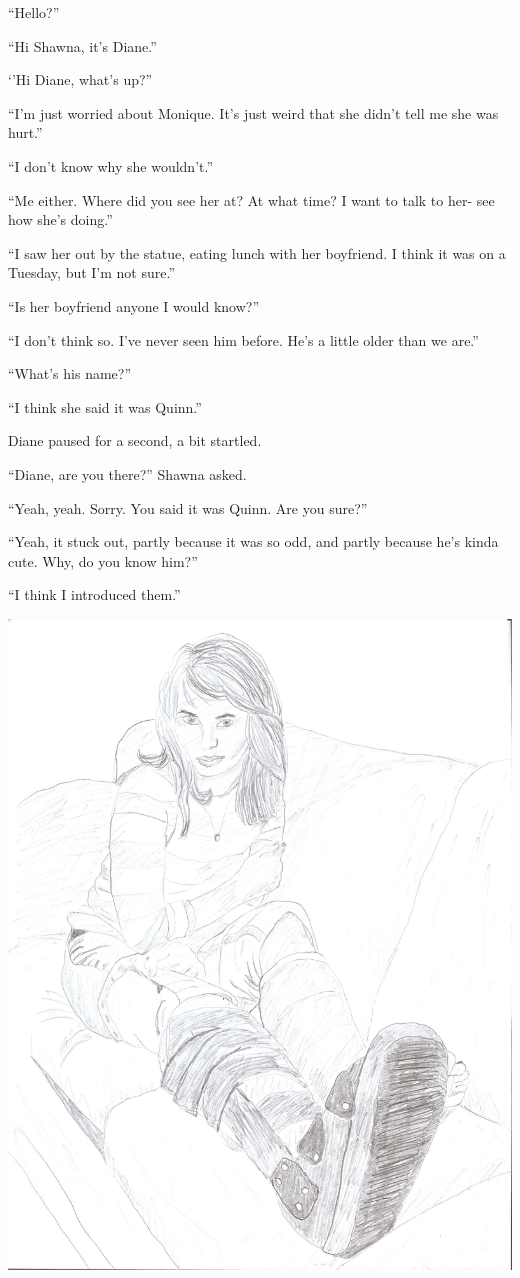 ``Hello?''

``Hi Shawna, it's Diane.''

‘'Hi Diane, what's up?''

``I'm just worried about Monique. It's just weird that she didn't tell me she was hurt.''

``I don't know why she wouldn't.''

``Me either. Where did you see her at? At what time? I want to talk to her- see how she's
doing.''

``I saw her out by the statue, eating lunch with her boyfriend. I think it was on a Tuesday,
but I'm not sure.''

``Is her boyfriend anyone I would know?''

``I don't think so. I've never seen him before. He's a little older than we are.''

``What's his name?''

``I think she said it was Quinn.''

Diane paused for a second, a bit startled.

``Diane, are you there?'' Shawna asked.

``Yeah, yeah. Sorry. You said it was Quinn. Are you sure?''

``Yeah, it stuck out, partly because it was so odd, and partly because he's kinda cute. Why,
do you know him?''

``I think I introduced them.''
\newpage
\begin{center}
\includegraphics[height=0.8\textheight]{images/kicks49.jpg}
\end{center}
